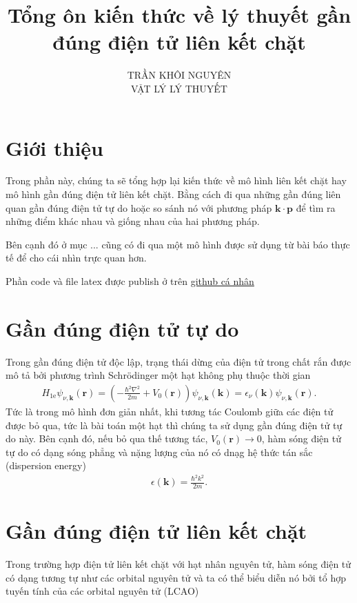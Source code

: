 \documentclass{article}
\title{\Huge{Tổng ôn kiến thức về lý thuyết gần đúng điện tử liên kết chặt}}
\begin{document}
\setlength{\parindent}{20pt}
\newpage
\author{TRẦN KHÔI NGUYÊN \\ VẬT LÝ LÝ THUYẾT}
\maketitle
\section{Giới thiệu}
Trong phần này, chúng ta sẽ tổng hợp lại kiến thức về mô hình liên kết chặt hay mô hình gần đúng điện tử liên kết chặt. Bằng cách đi qua những gần đúng liên quan gần đúng điện tử tự do hoặc so sánh nó với phương pháp $\mathbf{k} \cdot \mathbf{p}$ để tìm ra những điểm khác nhau và giống nhau của hai phương pháp.

Bên cạnh đó ở mục ... cũng có đi qua một mô hình được sử dụng từ bài báo thực tế để cho cái nhìn trực quan hơn.

Phần code và file latex được publish ở trên \hyperlink{https://github.com/nguyn21012003/ReviewTBM}{github cá nhân}

\section{Gần đúng điện tử tự do}
Trong gần đúng điện tử độc lập, trạng thái dừng của điện tử trong chất rắn được mô tả bởi phương trình Schr\"{o}dinger một hạt không phụ thuộc thời gian
\begin{gather}
	H_{\text{1e}} \psi_{\nu,\mathbf{k}} (\mathbf{r}) = \left(-\frac{\hbar^{2} \nabla^{2}}{2m} + V_{0}(\mathbf{r})\right) \psi_{\nu,\mathbf{k}}(\mathbf{k}) = \epsilon_{\nu}(\mathbf{k}) \psi_{\nu,\mathbf{k}}(\mathbf{r}).
\end{gather}
Tức là trong mô hình đơn giản nhất, khi tương tác Coulomb giữa các điện tử được bỏ qua, tức là bài toán một hạt thì chúng ta sử dụng gần đúng điện tử tự do này. Bên cạnh đó, nếu bỏ qua thế tương tác, $V_{0}(\mathbf{r}) \to 0$, hàm sóng điện tử tự do có dạng sóng phẳng và nặng lượng của nó có dnạg hệ thức tán sắc (dispersion energy)
\begin{gather}
	\epsilon(\mathbf{k}) = \frac{\hbar^{2} k^{2}}{2m}.
\end{gather}

\section{Gần đúng điện tử liên kết chặt}

Trong trường hợp điện tử liên kết chặt với hạt nhân nguyên tử, hàm sóng điện tử có dạng tương tự như các orbital nguyên tử và ta có thể biểu diễn nó bởi tổ hợp tuyến tính của các orbital nguyên tử (LCAO)
\end{document}
